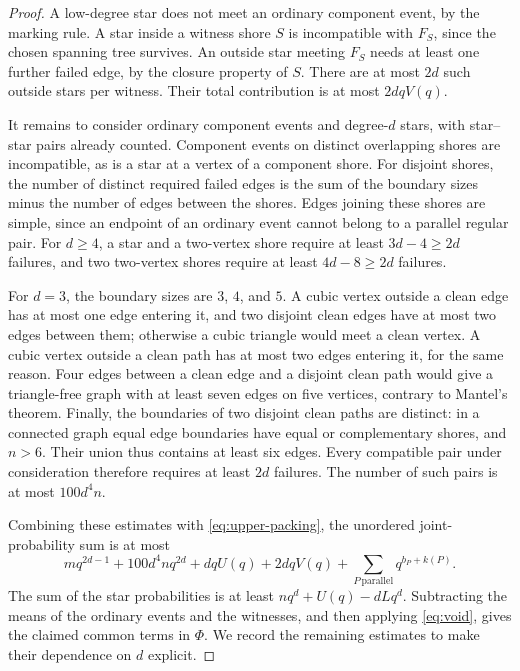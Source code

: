 \documentclass[11pt,reqno]{amsart}
\theoremstyle{remark}
\numberwithin{equation}{section}
\begin{document}
\begin{proof}
A low-degree star does not meet an ordinary component event, by
the marking rule. A star inside a witness shore $S$ is
incompatible with $F_S$, since the chosen spanning tree survives.
An outside star meeting $F_S$ needs at least one further failed
edge, by the closure property of $S$. There are at most $2d$ such
outside stars per witness. Their total contribution is at most
$2dqV(q)$.

It remains to consider ordinary component events and
degree-$d$ stars, with star--star pairs already counted.
Component events on distinct overlapping shores are incompatible,
as is a star at a vertex of a component shore. For disjoint
shores, the number of distinct required failed edges is the sum
of the boundary sizes minus the number of edges between the
shores. Edges joining these shores are simple, since an endpoint
of an ordinary event cannot belong to a parallel regular pair.
For $d\ge4$, a star and a two-vertex shore require at least
$3d-4\ge2d$ failures, and two two-vertex shores require at least
$4d-8\ge2d$ failures.

For $d=3$, the boundary sizes are $3$, $4$, and $5$. A cubic vertex
outside a clean edge has at most one edge entering it, and two
disjoint clean edges have at most two edges between them;
otherwise a cubic triangle would meet a clean vertex. A cubic
vertex outside a clean path has at most two edges entering it,
for the same reason. Four edges between a clean edge and a
disjoint clean path would give a triangle-free graph with at least
seven edges on five vertices, contrary to Mantel's theorem.
Finally, the boundaries of two disjoint clean paths are distinct:
in a connected graph equal edge boundaries have equal or
complementary shores, and $n>6$. Their union thus contains at
least six edges. Every compatible pair under consideration
therefore requires at least $2d$ failures. The number of such
pairs is at most $100d^4n$.

Combining these estimates with \eqref{eq:upper-packing}, the
unordered joint-probability sum is at most
\begin{equation}\label{eq:upper-pairs}
 mq^{2d-1}+100d^4nq^{2d}+dqU(q)+2dqV(q)
       +\sum_{P\,\mathrm{parallel}}q^{b_P+k(P)}.
\end{equation}
The sum of the star probabilities is at least
$nq^d+U(q)-dLq^d$. Subtracting the means of the ordinary events
and the witnesses, and then applying \eqref{eq:void}, gives the
claimed common terms in $\Phi$. We record the remaining
estimates to make their dependence on $d$ explicit.


\end{proof}
\end{document}
